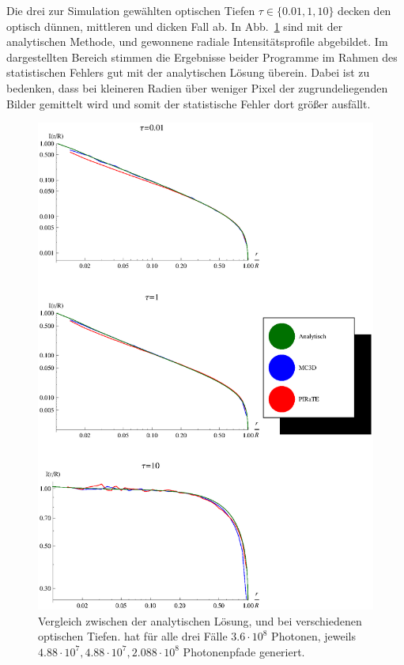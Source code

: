 	Die drei zur Simulation gewählten optischen Tiefen $\tau\in\{0.01,1,10\}$ decken den optisch dünnen, mittleren und dicken Fall ab.	In Abb.~\ref{fig:methodcomparisongraphics} sind mit der analytischen Methode, \mctd und \pirate gewonnene radiale Intensitätsprofile abgebildet.
	Im dargestellten Bereich stimmen die Ergebnisse beider Programme im Rahmen des statistischen Fehlers gut mit der analytischen Lösung überein. Dabei ist zu bedenken, dass bei kleineren Radien über weniger Pixel der zugrundeliegenden Bilder gemittelt wird und somit der statistische Fehler dort größer ausfällt.
		\begin{figure}
			\centering
			\includegraphics[height=1.0\textheight]{methodcomparisongraphics.eps}
			\caption{Vergleich zwischen der analytischen Lösung, \mctd und \pirate bei verschiedenen optischen Tiefen. \mctd hat für alle drei Fälle $3.6\cdot10^8$ Photonen, \pirate jeweils $4.88\cdot10^7,4.88\cdot10^7,2.088\cdot10^8$ Photonenpfade generiert.}
			\label{fig:methodcomparisongraphics}
		\end{figure}
	
